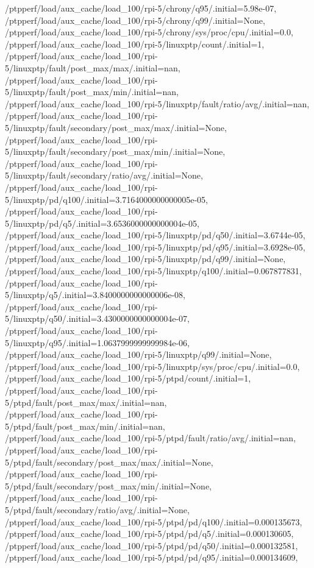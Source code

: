 {    /ptpperf/load/aux_cache/load_100/rpi-5/chrony/q95/.initial=5.98e-07,
    /ptpperf/load/aux_cache/load_100/rpi-5/chrony/q99/.initial=None,
    /ptpperf/load/aux_cache/load_100/rpi-5/chrony/sys/proc/cpu/.initial=0.0,
    /ptpperf/load/aux_cache/load_100/rpi-5/linuxptp/count/.initial=1,
    /ptpperf/load/aux_cache/load_100/rpi-5/linuxptp/fault/post_max/max/.initial=nan,
    /ptpperf/load/aux_cache/load_100/rpi-5/linuxptp/fault/post_max/min/.initial=nan,
    /ptpperf/load/aux_cache/load_100/rpi-5/linuxptp/fault/ratio/avg/.initial=nan,
    /ptpperf/load/aux_cache/load_100/rpi-5/linuxptp/fault/secondary/post_max/max/.initial=None,
    /ptpperf/load/aux_cache/load_100/rpi-5/linuxptp/fault/secondary/post_max/min/.initial=None,
    /ptpperf/load/aux_cache/load_100/rpi-5/linuxptp/fault/secondary/ratio/avg/.initial=None,
    /ptpperf/load/aux_cache/load_100/rpi-5/linuxptp/pd/q100/.initial=3.7164000000000005e-05,
    /ptpperf/load/aux_cache/load_100/rpi-5/linuxptp/pd/q5/.initial=3.6536000000000004e-05,
    /ptpperf/load/aux_cache/load_100/rpi-5/linuxptp/pd/q50/.initial=3.6744e-05,
    /ptpperf/load/aux_cache/load_100/rpi-5/linuxptp/pd/q95/.initial=3.6928e-05,
    /ptpperf/load/aux_cache/load_100/rpi-5/linuxptp/pd/q99/.initial=None,
    /ptpperf/load/aux_cache/load_100/rpi-5/linuxptp/q100/.initial=0.067877831,
    /ptpperf/load/aux_cache/load_100/rpi-5/linuxptp/q5/.initial=3.8400000000000006e-08,
    /ptpperf/load/aux_cache/load_100/rpi-5/linuxptp/q50/.initial=3.4300000000000004e-07,
    /ptpperf/load/aux_cache/load_100/rpi-5/linuxptp/q95/.initial=1.0637999999999984e-06,
    /ptpperf/load/aux_cache/load_100/rpi-5/linuxptp/q99/.initial=None,
    /ptpperf/load/aux_cache/load_100/rpi-5/linuxptp/sys/proc/cpu/.initial=0.0,
    /ptpperf/load/aux_cache/load_100/rpi-5/ptpd/count/.initial=1,
    /ptpperf/load/aux_cache/load_100/rpi-5/ptpd/fault/post_max/max/.initial=nan,
    /ptpperf/load/aux_cache/load_100/rpi-5/ptpd/fault/post_max/min/.initial=nan,
    /ptpperf/load/aux_cache/load_100/rpi-5/ptpd/fault/ratio/avg/.initial=nan,
    /ptpperf/load/aux_cache/load_100/rpi-5/ptpd/fault/secondary/post_max/max/.initial=None,
    /ptpperf/load/aux_cache/load_100/rpi-5/ptpd/fault/secondary/post_max/min/.initial=None,
    /ptpperf/load/aux_cache/load_100/rpi-5/ptpd/fault/secondary/ratio/avg/.initial=None,
    /ptpperf/load/aux_cache/load_100/rpi-5/ptpd/pd/q100/.initial=0.000135673,
    /ptpperf/load/aux_cache/load_100/rpi-5/ptpd/pd/q5/.initial=0.000130605,
    /ptpperf/load/aux_cache/load_100/rpi-5/ptpd/pd/q50/.initial=0.000132581,
    /ptpperf/load/aux_cache/load_100/rpi-5/ptpd/pd/q95/.initial=0.000134609,
}
